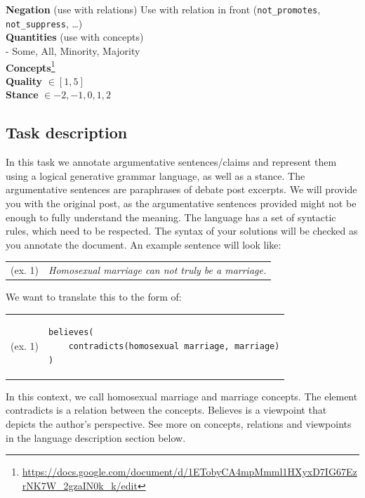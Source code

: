 \noindent \textbf{Negation} (use with relations)
Use with relation in front (\texttt{not\_promotes}, \texttt{not\_suppress}, \dots) \\
 
\noindent \textbf{Quantities} (use with concepts) \\
- Some, All, Minority, Majority \\
          
\noindent \textbf{Concepts}\footnote{\url{https://docs.google.com/document/d/1ETobyCA4mpMmml1HXyxD7IG67EzrNK7W_2gzaIN0k_k/edit}} \\

\noindent \textbf{Quality} $\in [1, 5]$ \\
 
\noindent \textbf{Stance} $ \in {-2, -1, 0, 1, 2}$ \\

\pagebreak

\subsection*{Task description}

In this task we annotate argumentative sentences/claims and represent them
using a logical generative grammar language, as well as a stance. The
argumentative sentences are paraphrases of debate post excerpts. We will
provide you with the original post, as the argumentative sentences provided
might not be enough to fully understand the meaning. 
The language has a set of syntactic rules, which need to be respected. The
syntax of your solutions will be checked as you annotate the document. 
An example sentence will look like:
\noindent\begin{tabular}{@{}lp{}}
(ex. 1) & \textit{Homosexual marriage can not truly be a marriage.}
\end{tabular} \vspace{0.4cm}

\noindent We want to translate this to the form of: 

\begin{tabular}{@{}m{1.5cm}  m{4.5cm}}
(ex. 1) &  \begin{verbatim}
believes(
    contradicts(homosexual marriage, marriage)
)
\end{verbatim}
\end{tabular}

In this context, we call homosexual marriage and marriage concepts. The element
contradicts is a relation between the concepts. Believes is a viewpoint that
depicts the author's perspective. See more on concepts, relations and
viewpoints in the language description section below. 

